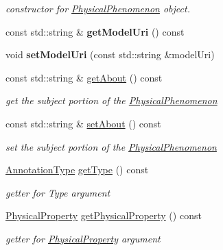 \begin{DoxyCompactItemize}
\begin{DoxyCompactList}\small\item\em constructor for \hyperlink{classomexmeta_1_1PhysicalPhenomenon}{Physical\+Phenomenon} object. \end{DoxyCompactList}\item 
\mbox{\label{classomexmeta_1_1PhysicalPhenomenon_a5528b12e5dbc702c0c270328662e7031}} 
const std\+::string \& {\bfseries get\+Model\+Uri} () const
\item 
\mbox{\label{classomexmeta_1_1PhysicalPhenomenon_aa1fd9929fb2e07fa20081b1a4c00c9d2}} 
void {\bfseries set\+Model\+Uri} (const std\+::string \&model\+Uri)
\item 
const std\+::string \& \hyperlink{classomexmeta_1_1PhysicalPhenomenon_a8be912d1256d6b913c4965f96f1b730b}{get\+About} () const
\begin{DoxyCompactList}\small\item\em get the subject portion of the \hyperlink{classomexmeta_1_1PhysicalPhenomenon}{Physical\+Phenomenon} \end{DoxyCompactList}\item 
const std\+::string \& \hyperlink{classomexmeta_1_1PhysicalPhenomenon_aa09896afed6124d042d7d8f82b21cae9}{set\+About} () const
\begin{DoxyCompactList}\small\item\em set the subject portion of the \hyperlink{classomexmeta_1_1PhysicalPhenomenon}{Physical\+Phenomenon} \end{DoxyCompactList}\item 
\hyperlink{namespaceomexmeta_a1129ebb8a92218ebb27b9c76ac8462f7}{Annotation\+Type} \hyperlink{classomexmeta_1_1PhysicalPhenomenon_a9676a1dcc458247a19d19cda16d640f4}{get\+Type} () const
\begin{DoxyCompactList}\small\item\em getter for Type argument \end{DoxyCompactList}\item 
\hyperlink{classomexmeta_1_1PhysicalProperty}{Physical\+Property} \hyperlink{classomexmeta_1_1PhysicalPhenomenon_ac741cab1f6df58b0de484fc1771ef839}{get\+Physical\+Property} () const
\begin{DoxyCompactList}\small\item\em getter for \hyperlink{classomexmeta_1_1PhysicalProperty}{Physical\+Property} argument \end{DoxyCompactList}\item 

\end{DoxyCompactItemize}
